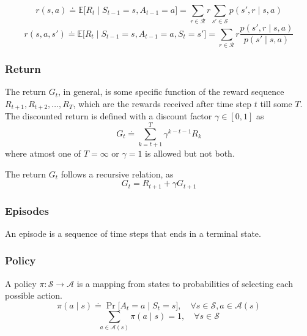 \begin{equation}
    r(s, a) \doteq \mathbb{E} \big[ R_{t} \mid S_{t-1} = s, A_{t-1} = a \big]
    = \sum_{r \in \mathcal{R}} r \sum_{s' \in \mathcal{S}}  p(s', r \mid s, a)
\end{equation}
\begin{equation}
    r(s, a, s') \doteq \mathbb{E} \big[ R_{t} \mid S_{t-1} = s, A_{t-1} = a, S_{t} = s' \big]
    = \sum_{r \in \mathcal{R}} r \frac{p(s', r \mid s, a)}{p(s' \mid s, a)}
\end{equation}

\subsubsection{Return}

The return \( G_t \), in general, is some specific function of the reward sequence \( R_{t+1}, R_{t+2}, \ldots, R_{T} \), which are the rewards received after time step \( t \) till some \( T \).
The discounted return is defined with a discount factor \( \gamma \in [0, 1] \) as
\begin{equation}
    G_t \doteq \sum_{k=t+1}^{T} \gamma^{k-t-1} R_k
\end{equation}
where atmost one of \( T = \infty \) or \( \gamma = 1 \) is allowed but not both.

The return \( G_t \) follows a recursive relation, as
\begin{equation}
    G_t = R_{t+1} + \gamma G_{t+1}
\end{equation}

\subsubsection{Episodes}

An episode is a sequence of time steps that ends in a terminal state.

\subsubsection{Policy}

A policy \( \pi: \mathcal{S} \to \mathcal{A} \) is a mapping from states to probabilities of selecting each possible action.
\begin{equation}
    \pi(a \mid s) \doteq \Pr \big[ A_t = a \mid S_t = s \big]
    , \quad \forall s \in \mathcal{S}, a \in \mathcal{A}(s)
\end{equation}
\begin{equation}
    \sum_{a \in \mathcal{A}(s)} \pi(a \mid s) = 1
    , \quad \forall s \in \mathcal{S}
\end{equation}

